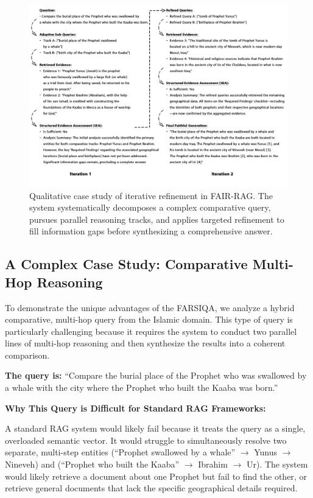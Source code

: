 \documentclass[11pt]{article}
\begin{document}
\begin{figure}[t]
\centering
\includegraphics[width=\textwidth]{figure_4.png}
\caption{Qualitative case study of iterative refinement in FAIR-RAG. The system systematically decomposes a complex comparative query, pursues parallel reasoning tracks, and applies targeted refinement to fill information gaps before synthesizing a comprehensive answer.}
\label{fig:case-study-iterative}
\end{figure}

\subsection{A Complex Case Study: Comparative Multi-Hop Reasoning}

To demonstrate the unique advantages of the FARSIQA, we analyze a hybrid comparative, multi-hop query from the Islamic domain. This type of query is particularly challenging because it requires the system to conduct two parallel lines of multi-hop reasoning and then synthesize the results into a coherent comparison.

\textbf{The query is:} ``Compare the burial place of the Prophet who was swallowed by a whale with the city where the Prophet who built the Kaaba was born.''

\textbf{Why This Query is Difficult for Standard RAG Frameworks:}

A standard RAG system would likely fail because it treats the query as a single, overloaded semantic vector. It would struggle to simultaneously resolve two separate, multi-step entities (``Prophet swallowed by a whale'' $\rightarrow$ Yunus $\rightarrow$ Nineveh) and (``Prophet who built the Kaaba'' $\rightarrow$ Ibrahim $\rightarrow$ Ur). The system would likely retrieve a document about one Prophet but fail to find the other, or retrieve general documents that lack the specific geographical details required.
\end{document}
